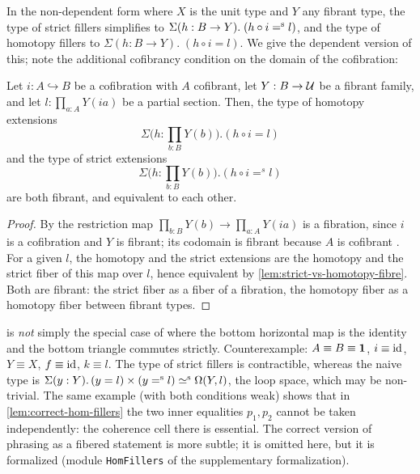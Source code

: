 In the non-dependent form where $X$ is the unit type and $Y$ any fibrant type, the type of strict fillers simplifies to 
$\Sigma(h : B \to Y).\;(h \circ i \mathrel{=^\textup{s}} l)$, and the type of homotopy fillers to $\Sigma(h : B \to Y).\;(h \circ i = l)$.
We give the dependent version of this; note the additional cofibrancy condition on the domain of the cofibration:


\begin{lemma}\label{lem:weak=strict-dep}
	Let $i : A \hookrightarrow B$ be a cofibration with $A$ cofibrant, let
	$Y : B \to \mathcal{U}$ be a fibrant family, and let $l : \prod_{a : A} Y(i a)$
	be a partial section. 
	Then, the type of homotopy extensions
	\begin{equation}
		\Sigma\bigl(h : \prod_{b : B} Y(b)\bigr). (h \circ i = l)
	\end{equation}
	and the type of strict extensions
	\begin{equation}
		\Sigma\bigl(h : \prod_{b : B} Y(b)\bigr). (h \circ i =^s l)
	\end{equation}
	are both fibrant, and equivalent to each other.
\end{lemma}
\begin{proof}
	By \citet[Lem.~3.18]{2LTT} the restriction map $\prod_{b : B} Y(b) \to
	\prod_{a : A} Y(i a)$ is a fibration, since $i$ is a cofibration and $Y$
	is fibrant; its codomain is fibrant because $A$ is cofibrant
	\citep[Cor.~3.20]{2LTT}. For a given $l$, the homotopy and the strict extensions
	are the homotopy and the strict fiber of this map over $l$, hence equivalent by
	\cref{lem:strict-vs-homotopy-fibre}. Both are fibrant: the strict fiber as a
	fiber of a fibration, the homotopy fiber as a homotopy fiber between fibrant
	types.
\end{proof}

\begin{remark}
	 is \emph{not} simply the special case of  where the bottom horizontal map is the identity and the bottom triangle commutes strictly.
	Counterexample: $A \equiv B \equiv \mathbf{1}$, $i \equiv \operatorname{id}$, $Y \equiv X$,
	$f \equiv \operatorname{id}$, $k \equiv l$. The type of strict fillers is contractible, whereas
	the naive type is $\Sigma(y:Y).\,(y = l) \times (y \mathrel{=^\textup{s}} l) \mathrel{\simeq^\textup{s}} \Omega(Y,l)$,
	the loop space, which may be non-trivial. The same example (with both conditions weak) shows that in
	\cref{lem:correct-hom-fillers} the two inner equalities $p_1,p_2$ cannot be taken
	independently: the coherence cell there is essential.
	The correct version of phrasing  as a fibered statement is more subtle; it is omitted here, but it is formalized (module \texttt{HomFillers} of the supplementary formalization).
\end{remark}




